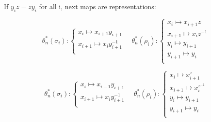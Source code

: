 \documentclass{article}
\begin{document}
If $y_i z = z y_i$ for all i, next maps are representations:

\begin{equation}\label{defGV}
\theta_n^*(\sigma_i):
\begin{cases}
x_i \mapsto x_{i+1}y_{i+1}\\
x_{i+1} \mapsto x_iy_{i+1}^{-1}\\
\end{cases}\quad
\theta_n^*(\rho_i):
\begin{cases}
x_i \mapsto x_{i+1}z\\
x_{i+1} \mapsto x_iz^{-1}\\
y_i \mapsto y_{i+1}\\
y_{i+1} \mapsto y_i\\
\end{cases}
\end{equation}

\begin{equation}\label{defGV}
\theta_n^*(\sigma_i):
\begin{cases}
x_i \mapsto x_{i+1}y_{i+1}\\
x_{i+1} \mapsto x_iy_{i+1}^{-1}\\
\end{cases}\quad
\theta_n^*(\rho_i):
\begin{cases}
x_i \mapsto x_{i+1}^z\\
x_{i+1} \mapsto x_i^{z^{-1}}\\
y_i \mapsto y_{i+1}\\
y_{i+1} \mapsto y_i\\
\end{cases}
\end{equation}
\end{document}
